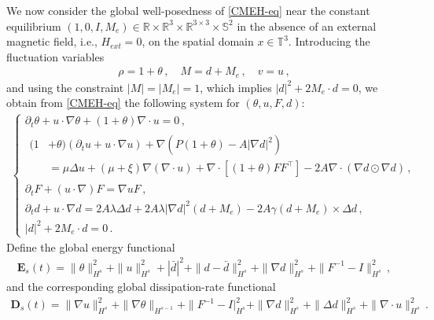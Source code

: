 \documentclass[reqno,11pt]{amsart}
\numberwithin{equation}{section}
\def\p{\partial}
\begin{document}
We now consider the global well-posedness of \eqref{CMEH-eq} near the constant equilibrium $(1, 0, I, M_e) \in \mathbb{R} \times \mathbb{R}^3 \times \mathbb{R}^{3 \times 3} \times \mathbb{S}^2$ in the absence of an external magnetic field, i.e., $H_{ext} = 0$, on the spatial domain $x \in \mathbb{T}^3$. Introducing the fluctuation variables
\begin{equation*}
    \begin{aligned}
        \rho=1+\theta \,, \quad M=d+M_e \,, \quad v=u \,,
    \end{aligned}
\end{equation*}
and using the constraint $|M|= |M_e|=1$, which implies $|d|^2+2 M_e\cdot d=0$, we obtain from \eqref{CMEH-eq} the following system for $(\theta,u,F,d)$:
\begin{align}\label{CMEH-eqG}
	\begin{cases}
		\p_t \theta +u\cdot\nabla\theta+(1+\theta)\nabla\cdot u = 0 \,, \\
		\begin{aligned}
			(1&+\theta)(\p_t u+u\cdot\nabla u) + \nabla \left( P(1+\theta) - A |\nabla d|^2 \right) 
			\\[5pt] & 
			=  \mu\Delta u+(\mu+\xi)\nabla(\nabla \cdot u)+\nabla\cdot[(1+\theta)FF^\top]-2A \nabla \cdot ( \nabla d \odot \nabla d)  \,, 
		\end{aligned} \\
		\partial_t F + (u \cdot \nabla) F = \nabla u F \,, \\
		\p_t d + u\cdot \nabla d = 2A\lambda \Delta d+2A\lambda|\nabla d|^2(d+M_e)-2A\gamma(d+M_e)\times \Delta d
		\,, \\ 
	|d|^2+2M_e\cdot d=0 \,. 
	\end{cases}
\end{align}
Define the global energy functional
\begin{equation}\label{close-eq5}
\begin{aligned}
\mathbf{E}_s(t)=\|\theta\|^2_{H^s}+\|u\|^2_{H^s}+ |\bar{d} |^2+\|d-\bar{d}\|^2_{H^s}+\|\nabla d\|^2_{H^s}+\|F^{-1} - I\|^2_{H^s}\,,
\end{aligned}
\end{equation}
and the corresponding global dissipation-rate functional
\begin{equation}\label{close-eq6}
\begin{aligned}
\mathbf{D}_s(t)=\|\nabla u\|^2_{H^s}+\|\nabla\theta\|_{H^{s-1}}+\|F^{-1} - I|^2_{H^s}+\|\nabla d \|^2_{H^s}+\|\Delta d \|^2_{H^s}+\|\nabla \cdot u \|^2_{H^s}\,.
\end{aligned}
\end{equation}
\end{document}
